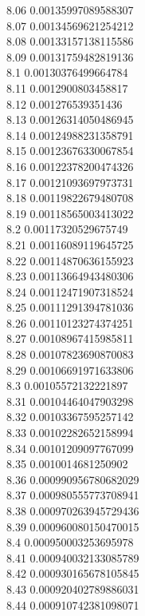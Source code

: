 {8.06	0.00135997089588307\\
8.07	0.00134569621254212\\
8.08	0.00133157138115586\\
8.09	0.00131759482819136\\
8.1	0.00130376499664784\\
8.11	0.0012900803458817\\
8.12	0.001276539351436\\
8.13	0.00126314050486945\\
8.14	0.00124988231358791\\
8.15	0.00123676330067854\\
8.16	0.00122378200474326\\
8.17	0.00121093697973731\\
8.18	0.00119822679480708\\
8.19	0.00118565003413022\\
8.2	0.00117320529675749\\
8.21	0.00116089119645725\\
8.22	0.00114870636155923\\
8.23	0.00113664943480306\\
8.24	0.00112471907318524\\
8.25	0.00111291394781036\\
8.26	0.00110123274374251\\
8.27	0.00108967415985811\\
8.28	0.00107823690870083\\
8.29	0.00106691971633806\\
8.3	0.00105572132221897\\
8.31	0.00104464047903298\\
8.32	0.00103367595257142\\
8.33	0.00102282652158994\\
8.34	0.00101209097767099\\
8.35	0.0010014681250902\\
8.36	0.000990956780682029\\
8.37	0.000980555773708941\\
8.38	0.000970263945729436\\
8.39	0.000960080150470015\\
8.4	0.000950003253695978\\
8.41	0.000940032133085789\\
8.42	0.000930165678105845\\
8.43	0.000920402789886031\\
8.44	0.000910742381098071\\
}
